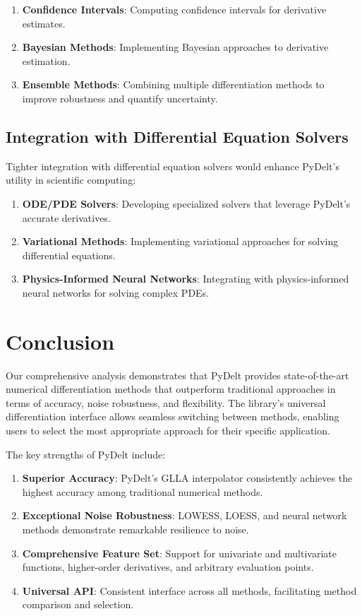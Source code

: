 \documentclass[conference]{IEEEtran}
\begin{document}
\begin{enumerate}
\item \textbf{Confidence Intervals}: Computing confidence intervals for derivative estimates.
\item \textbf{Bayesian Methods}: Implementing Bayesian approaches to derivative estimation.
\item \textbf{Ensemble Methods}: Combining multiple differentiation methods to improve robustness and quantify uncertainty.
\end{enumerate}

\subsection{Integration with Differential Equation Solvers}

Tighter integration with differential equation solvers would enhance PyDelt's utility in scientific computing:

\begin{enumerate}
\item \textbf{ODE/PDE Solvers}: Developing specialized solvers that leverage PyDelt's accurate derivatives.
\item \textbf{Variational Methods}: Implementing variational approaches for solving differential equations.
\item \textbf{Physics-Informed Neural Networks}: Integrating with physics-informed neural networks for solving complex PDEs.
\end{enumerate}

\section{Conclusion}

Our comprehensive analysis demonstrates that PyDelt provides state-of-the-art numerical differentiation methods that outperform traditional approaches in terms of accuracy, noise robustness, and flexibility. The library's universal differentiation interface allows seamless switching between methods, enabling users to select the most appropriate approach for their specific application.

The key strengths of PyDelt include:

\begin{enumerate}
\item \textbf{Superior Accuracy}: PyDelt's GLLA interpolator consistently achieves the highest accuracy among traditional numerical methods.
\item \textbf{Exceptional Noise Robustness}: LOWESS, LOESS, and neural network methods demonstrate remarkable resilience to noise.
\item \textbf{Comprehensive Feature Set}: Support for univariate and multivariate functions, higher-order derivatives, and arbitrary evaluation points.
\item \textbf{Universal API}: Consistent interface across all methods, facilitating method comparison and selection.
\end{enumerate}
\end{document}
